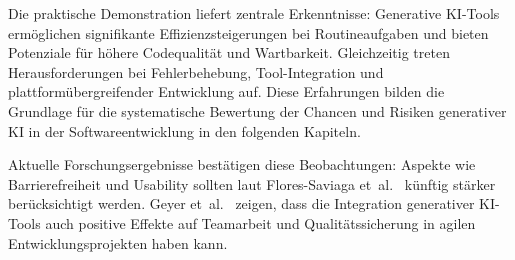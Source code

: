 Die praktische Demonstration liefert zentrale Erkenntnisse: Generative KI-Tools
ermöglichen signifikante Effizienzsteigerungen bei Routineaufgaben und bieten
Potenziale für höhere Codequalität und Wartbarkeit. Gleichzeitig treten
Herausforderungen bei Fehlerbehebung, Tool-Integration und
plattformübergreifender Entwicklung auf. Diese Erfahrungen bilden die Grundlage
für die systematische Bewertung der Chancen und Risiken generativer KI in der
Softwareentwicklung in den folgenden Kapiteln.

Aktuelle Forschungsergebnisse bestätigen diese Beobachtungen: Aspekte wie
Barrierefreiheit und Usability sollten laut Flores-Saviaga
et~al.~\cite{flores-saviaga_impact_2025} künftig stärker berücksichtigt werden.
Geyer et~al.~\cite{geyer_case_2025} zeigen, dass die Integration generativer
KI-Tools auch positive Effekte auf Teamarbeit und Qualitätssicherung in agilen
Entwicklungsprojekten haben kann.
